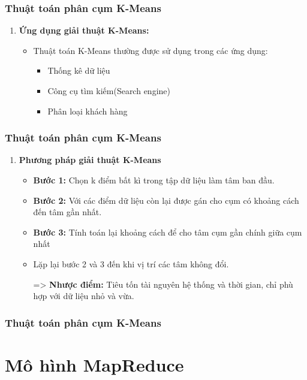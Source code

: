 \documentclass[12pt]{beamer}
\begin{document}
	\begin{frame}
		\frametitle{Thuật toán phân cụm K-Means}
		\begin{enumerate} [\textbf{2.}]
			\item \textbf{Ứng dụng giải thuật K-Means:}
			\begin{itemize}
				\item Thuật toán K-Means thường được sử dụng trong các ứng dụng:
				\begin{itemize}
					\item Thống kê dữ liệu
					\item Công cụ tìm kiếm(Search engine)
					\item Phân loại khách hàng
				\end{itemize}
			\end{itemize}
		\end{enumerate}
	\end{frame}
	
	\begin{frame}
		\frametitle{Thuật toán phân cụm K-Means}
		\begin{enumerate} [\textbf{3.}]
			\item \textbf{Phương pháp giải thuật K-Means}
				\begin{itemize}
					\item \textbf{Bước 1:} Chọn k điểm bất kì trong tập dữ liệu làm tâm ban đầu.
					\item \textbf{Bước 2:} Với các điểm dữ liệu còn lại được gán cho cụm có khoảng cách đến tâm gần nhất.
					\item \textbf{Bước 3:} Tính toán lại khoảng cách để cho tâm cụm gần chính giữa cụm nhất
					\item Lặp lại bước 2 và 3 đến khi vị trí các tâm không đổi.
					\item[=>] \textbf{Nhược điểm:} Tiêu tốn tài nguyên hệ thống và thời gian, chỉ phù hợp với dữ liệu nhỏ và vừa.
				\end{itemize}
		\end{enumerate}
	\end{frame}

	\begin{frame}
		\frametitle{Thuật toán phân cụm K-Means}
		\animategraphics[loop, controls, width=6cm]{1}{kmeans/kmeans-}{0}{13}
	\end{frame}
	
	\section{Mô hình MapReduce}
\end{document}
